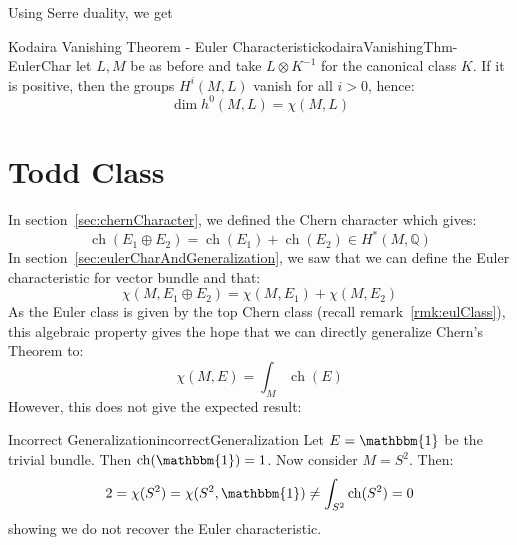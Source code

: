 \documentclass{book}
\newenvironment{Proof}[1][]
  {\begin{ProofTcb}[#1]}
  {\end{ProofTcb}}
\newcommand{\Q}{{\mathbb{Q}}}
\newcommand{\ch}{{\operatorname{ch}}}
\renewcommand{\ch}{{\operatorname{ch}}}
\begin{document}
\begin{Proof}
\cite{deligneRelevementsModulop2etDecomposition1987}
\end{Proof}

Using Serre duality, we get

\begin{thm}{Kodaira Vanishing Theorem - Euler Characteristic}{kodairaVanishingThm-EulerChar}
  let $L,M$ be as before and take $L\otimes K^{-1}$ for the canonical class $K$. If it is positive, then the
  groups $H^i(M, L)$ vanish for all $i > 0$, hence:
  \[
    \dim h^0(M, L) = \chi(M, L)
  \]
\end{thm}

\begin{Proof}
  \cite{deligneRelevementsModulop2etDecomposition1987}
\end{Proof}



















\chapter{Todd Class}\label{cha:toddGenus}

In section~\ref{sec:chernCharacter}, we defined the Chern character which gives:
\[
  \ch(E_1\oplus E_2) = \ch(E_1) + \ch(E_2) \in H^*(M, \Q)
\]
In section~\ref{sec:eulerCharAndGeneralization}, we saw that we can define the Euler characteristic for vector
bundle and that:
\[
  \chi(M, E_1\oplus E_2) = \chi(M, E_1) + \chi(M, E_2)
\]
As the Euler class is given by the top Chern class (recall remark~\ref{rmk:eulClass}), this algebraic property gives the hope that we can directly generalize Chern's Theorem to:
\[
  \chi(M, E) = \int_M \ch(E)
\]
However, this does not give the expected result:

\begin{example}{Incorrect Generalization}{incorrectGeneralization}
  Let $E = \mathbbm{1}$ be the trivial bundle. Then $\ch(\mathbbm{1}) = 1$. Now consider $M= S^2$. Then:
  \[
    2 = \chi({S^2}) = \chi({S^2}, \mathbbm{1}) \ne \int_{S^2} \ch(S^2) = 0
  \]
  showing we do not recover the Euler characteristic.
\end{example}
\end{document}
